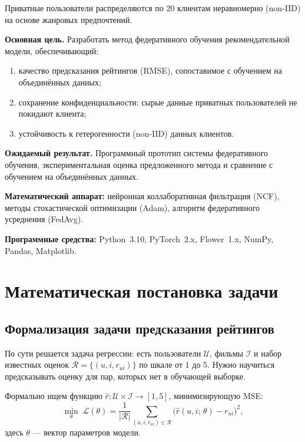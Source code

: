 \documentclass[14pt,a4paper]{extarticle}
\begin{document}
Приватные пользователи распределяются по 20 клиентам неравномерно (non-IID) на основе жанровых предпочтений.

\textbf{Основная цель.}
Разработать метод федеративного обучения рекомендательной модели, обеспечивающий:
\begin{enumerate}
  \item качество предсказания рейтингов (RMSE), сопоставимое с обучением на объединённых данных;
  \item сохранение конфиденциальности: сырые данные приватных пользователей не покидают клиента;
  \item устойчивость к гетерогенности (non-IID) данных клиентов.
\end{enumerate}

\textbf{Ожидаемый результат.}
Программный прототип системы федеративного обучения, экспериментальная оценка предложенного метода и сравнение с обучением на объединённых данных.

\textbf{Математический аппарат:}
нейронная коллаборативная фильтрация (NCF), методы стохастической оптимизации (Adam), алгоритм федеративного усреднения (FedAvg).

\textbf{Программные средства:}
Python~3.10, PyTorch~2.x, Flower~1.x, NumPy, Pandas, Matplotlib.

\newpage


\section{Математическая постановка задачи}

\subsection{Формализация задачи предсказания рейтингов}

По сути решается задача регрессии: есть пользователи $\mathcal{U}$, фильмы $\mathcal{I}$ и набор известных оценок $\mathcal{R} = \{(u, i, r_{ui})\}$ по шкале от 1 до 5. Нужно научиться предсказывать оценку для пар, которых нет в обучающей выборке.

Формально ищем функцию $\hat{r} : \mathcal{U} \times \mathcal{I} \to [1, 5]$, минимизирующую MSE:
\begin{equation}
\min_{\theta} \; \mathcal{L}(\theta) = \frac{1}{|\mathcal{R}|} \sum_{(u, i, r_{ui}) \in \mathcal{R}} \bigl( \hat{r}(u, i;\, \theta) - r_{ui} \bigr)^2,
\label{eq:mse}
\end{equation}
здесь $\theta$ --- вектор параметров модели.
\end{document}
